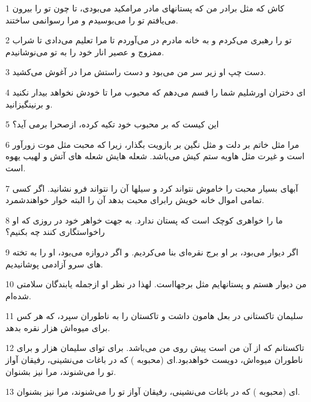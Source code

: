\par 1 کاش که مثل برادر من که پستانهای مادر مرامکید می‌بودی، تا چون تو را بیرون می‌یافتم تو را می‌بوسیدم و مرا رسوانمی ساختند.
\par 2 تو را رهبری می‌کردم و به خانه مادرم در می‌آوردم تا مرا تعلیم می‌دادی تا شراب ممزوج و عصیر انار خود را به تو می‌نوشانیدم.
\par 3 دست چپ او زیر سر من می‌بود و دست راستش مرا در آغوش می‌کشید.
\par 4 ‌ای دختران اورشلیم شما را قسم می‌دهم که محبوب مرا تا خودش نخواهد بیدار نکنید و برنینگیزانید.
\par 5 این کیست که بر محبوب خود تکیه کرده، ازصحرا برمی آید؟
\par 6 مرا مثل خاتم بر دلت و مثل نگین بر بازویت بگذار، زیرا که محبت مثل موت زورآور است و غیرت مثل هاویه ستم کیش می‌باشد. شعله هایش شعله های آتش و لهیب یهوه است.
\par 7 آبهای بسیار محبت را خاموش نتواند کرد و سیلها آن را نتواند فرو نشانید. اگر کسی تمامی اموال خانه خویش رابرای محبت بدهد آن را البته خوار خواهندشمرد.
\par 8 ما را خواهری کوچک است که پستان ندارد. به جهت خواهر خود در روزی که او راخواستگاری کنند چه بکنیم؟
\par 9 اگر دیوار می‌بود، بر او برج نقره‌ای بنا می‌کردیم. و اگر دروازه می‌بود، او را به تخته های سرو آزادمی پوشانیدیم.
\par 10 من دیوار هستم و پستانهایم مثل برجهااست. لهذا در نظر او از‌جمله یابندگان سلامتی شده‌ام.
\par 11 سلیمان تاکستانی در بعل هامون داشت و تاکستان را به ناطوران سپرد، که هر کس برای میوه‌اش هزار نقره بدهد.
\par 12 تاکستانم که از آن من است پیش روی من می‌باشد. برای تو‌ای سلیمان هزار و برای ناطوران میوه‌اش، دویست خواهدبود.‌ای (محبوبه ) که در باغات می‌نشینی، رفیقان آواز تو را می‌شنوند، مرا نیز بشنوان.
\par 13 ‌ای (محبوبه ) که در باغات می‌نشینی، رفیقان آواز تو را می‌شنوند، مرا نیز بشنوان.


